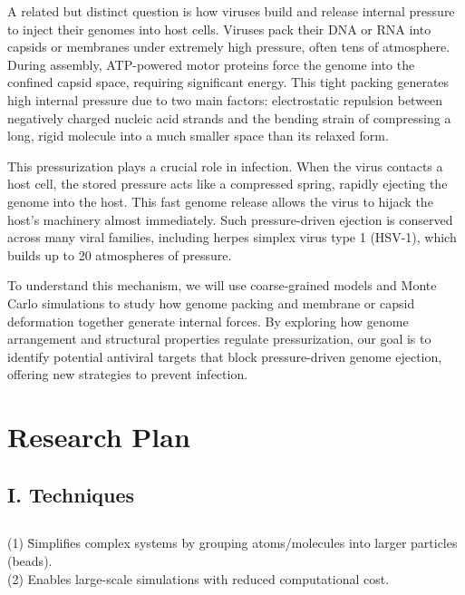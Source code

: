 \documentclass[12pt]{article}
\begin{document}
\begin{flushleft}

A related but distinct question is how viruses build and release internal pressure to inject their genomes into host cells. 
Viruses pack their DNA or RNA into capsids or membranes under extremely high pressure, often tens of atmosphere. During assembly, ATP-powered motor proteins force the genome into the confined capsid space, requiring significant energy. This tight packing generates high internal pressure due to two main factors: electrostatic repulsion between negatively charged nucleic acid strands and the bending strain of compressing a long, rigid molecule into a much smaller space than its relaxed form\cite{BrandarizNunez2019}.

This pressurization plays a crucial role in infection. When the virus contacts a host cell, the stored pressure acts like a compressed spring, rapidly ejecting the genome into the host. This fast genome release allows the virus to hijack the host’s machinery almost immediately. Such pressure-driven ejection is conserved across many viral families, including herpes simplex virus type 1 (HSV-1), which builds up to 20 atmospheres of pressure.

To understand this mechanism, we will use coarse-grained models and Monte Carlo simulations to study how genome packing and membrane or capsid deformation together generate internal forces. By exploring how genome arrangement and structural properties regulate pressurization, our goal is to identify potential antiviral targets that block pressure-driven genome ejection, offering new strategies to prevent infection.






\vspace{-2em} 
\section*{Research Plan}
\vspace{-1em}
\subsection*{I. Techniques}
\vspace{-1em}
 \subsection*{}
\begin{tabbing}
\indent\indent	(1) \= Simplifies complex systems by grouping atoms/molecules into larger particles (beads).\\
\indent\indent	(2) \> Enables large-scale simulations with reduced computational cost.
\end{tabbing}




\end{flushleft}
\end{document}
